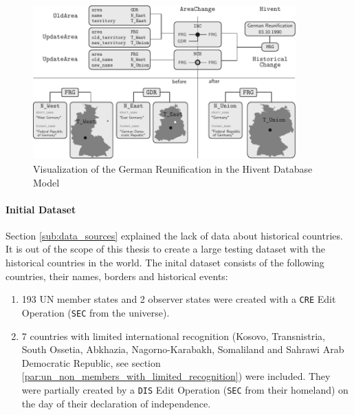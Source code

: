\begin{figure}[ht]
  \vspace{1em}
  \includegraphics[width=0.9\textwidth]{graphics/development/database_model/example_reunification}
  \caption{Visualization of the German Reunification in the Hivent Database Model}
  \label{fig:example_reunification_2}
\end{figure}



\paragraph{Initial Dataset} %
\label{par:initial_dataset}

Section \ref{sub:data_sources} explained the lack of data about historical countries. It is out of the scope of this thesis to create a large testing dataset with the historical countries in the world. The inital dataset consists of the following countries, their names, borders and historical events:

\begin{enumerate}
  \item 193 UN member states and 2 observer states were created with a \texttt{CRE} Edit Operation (\texttt{SEC} from the universe).
  \item 7 countries with limited international recognition (Kosovo, Transnistria, South Ossetia, Abkhazia, Nagorno-Karabakh, Somaliland and Sahrawi Arab Democratic Republic, see section \ref{par:un_non_members_with_limited_recognition}) were included. They were partially created by a \texttt{DIS} Edit Operation (\texttt{SEC} from their homeland) on the day of their declaration of independence.
\end{enumerate}

